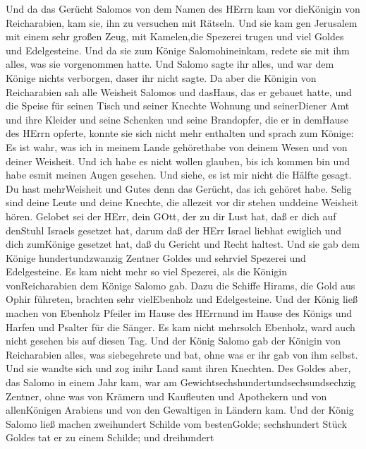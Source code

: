  Und da das Gerücht Salomos von dem Namen des HErrn kam vor
dieKönigin von Reicharabien, kam sie, ihn zu versuchen mit Rätseln.
 Und sie kam gen Jerusalem mit einem sehr großen Zeug, mit
Kamelen,die Spezerei trugen und viel Goldes und Edelgesteine. Und da sie
zum Könige Salomohineinkam, redete sie mit ihm alles, was sie
vorgenommen hatte.  Und Salomo sagte ihr alles, und war dem
Könige nichts verborgen, daser ihr nicht sagte.  Da aber die
Königin von Reicharabien sah alle Weisheit Salomos und dasHaus, das er
gebauet hatte,  und die Speise für seinen Tisch und seiner
Knechte Wohnung und seinerDiener Amt und ihre Kleider und seine Schenken
und seine Brandopfer, die er in demHause des HErrn opferte, konnte sie
sich nicht mehr enthalten  und sprach zum Könige: Es ist
wahr, was ich in meinem Lande gehörethabe von deinem Wesen und von
deiner Weisheit.  Und ich habe es nicht wollen glauben, bis
ich kommen bin und habe esmit meinen Augen gesehen. Und siehe, es ist
mir nicht die Hälfte gesagt. Du hast mehrWeisheit und Gutes denn das
Gerücht, das ich gehöret habe.  Selig sind deine Leute und
deine Knechte, die allezeit vor dir stehen unddeine Weisheit hören.
 Gelobet sei der HErr, dein GOtt, der zu dir Lust hat, daß
er dich auf denStuhl Israels gesetzet hat, darum daß der HErr Israel
liebhat ewiglich und dich zumKönige gesetzet hat, daß du Gericht und
Recht haltest.  Und sie gab dem Könige hundertundzwanzig
Zentner Goldes und sehrviel Spezerei und Edelgesteine. Es kam nicht mehr
so viel Spezerei, als die Königin vonReicharabien dem Könige Salomo gab.
 Dazu die Schiffe Hirams, die Gold aus Ophir führeten,
brachten sehr vielEbenholz und Edelgesteine.  Und der König
ließ machen von Ebenholz Pfeiler im Hause des HErrnund im Hause des
Königs und Harfen und Psalter für die Sänger. Es kam nicht mehrsolch
Ebenholz, ward auch nicht gesehen bis auf diesen Tag.  Und
der König Salomo gab der Königin von Reicharabien alles, was
siebegehrete und bat, ohne was er ihr gab von ihm selbst. Und sie wandte
sich und zog inihr Land samt ihren Knechten.  Des Goldes
aber, das Salomo in einem Jahr kam, war am
Gewichtsechshundertundsechsundsechzig Zentner,  ohne was
von Krämern und Kaufleuten und Apothekern und von allenKönigen Arabiens
und von den Gewaltigen in Ländern kam.  Und der König
Salomo ließ machen zweihundert Schilde vom bestenGolde; sechshundert
Stück Goldes tat er zu einem Schilde;  und dreihundert
